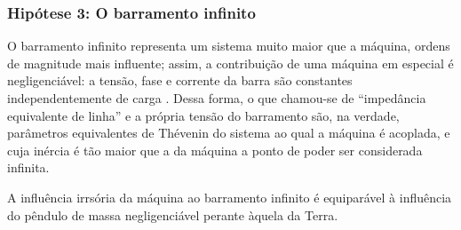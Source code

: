 \documentclass[10pt, compress,xcolor={svgnames,dvipsnames,x11names}]{beamer}
\begin{document}
\begin{frame}%
\frametitle{Hipótese 3: O barramento infinito}
\scriptsize

	O barramento infinito representa um sistema muito maior que a máquina, ordens de magnitude mais influente; assim, a contribuição de uma máquina em especial é negligenciável: a tensão, fase e corrente da barra são constantes independentemente de carga . Dessa forma, o que chamou-se de ``impedância equivalente de linha'' e a própria tensão do barramento são, na verdade, parâmetros equivalentes de Thévenin do sistema ao qual a máquina é acoplada, e cuja inércia é tão maior que a da máquina a ponto de poder ser considerada infinita.

	A influência irrsória da máquina ao barramento infinito é equiparável à influência do pêndulo de massa negligenciável perante àquela da Terra.

\normalsize
\end{frame}%
\end{document}
